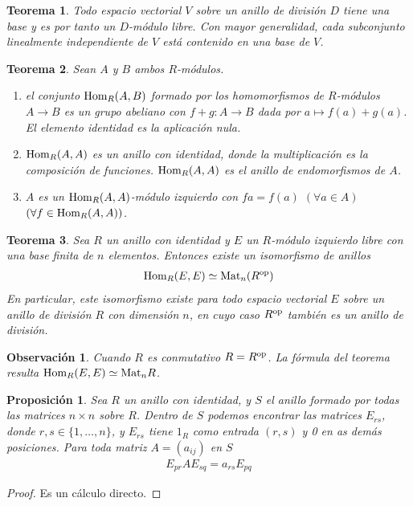 \documentclass{report}
\newcommand{\Hom}{\textnormal{Hom}}
\newcommand{\Mat}{\textnormal{Mat}}
\newtheorem{theorem}{Teorema}
\newtheorem{proposition}{Proposición}
\newtheorem{remark}{Observación}
\begin{document}
  \begin{theorem}
    \label{theorem:vectorSpaceBasis}
    Todo espacio vectorial \(V\) sobre un anillo de división \(D\) tiene una base y es por tanto un \(D\)-módulo libre.
    Con mayor generalidad, cada subconjunto linealmente independiente de \(V\) está contenido en una base de \(V\).
  \end{theorem}

  \begin{theorem}
    Sean \(A\) y \(B\) ambos \(R\)-módulos.
    \begin{enumerate}
      \item el conjunto \(\Hom_R(A, B)\) formado por los homomorfismos de \(R\)-módulos \(A \rightarrow B\) es un grupo abeliano con \(f + g : A \rightarrow B\) dada por \(a \mapsto f(a) + g(a)\).
      El elemento identidad es la aplicación nula.
      \item \(\Hom_R(A, A)\) es un anillo con identidad, donde la multiplicación es la composición de funciones.
      \(\Hom_R(A, A)\) es el \emph{anillo de endomorfismos} de \(A\).
      \item \(A\) es un \(\Hom_R(A, A)\)-módulo izquierdo con \(f a = f(a)\) \((\forall a \in A)\) \((\forall f \in \Hom_R(A, A))\).
    \end{enumerate}
  \end{theorem}

  \begin{theorem}
    \label{theorem:isomorphismBetweenMatrixAndHomomorphismRings}
    Sea \(R\) un anillo con identidad y \(E\) un \(R\)-módulo izquierdo libre con una base finita de \(n\) elementos.
    Entonces existe un isomorfismo de anillos
    \begin{align}
      \Hom_R(E, E)
      \simeq
      \Mat_n(R^{\textnormal{op}})
    \end{align}
    En particular, este isomorfismo existe para todo espacio vectorial \(E\) sobre un anillo de división \(R\) con dimensión \(n\), en cuyo caso \(R^{\textnormal{op}}\) también es un anillo de división.
  \end{theorem}
  \begin{remark}
    Cuando \(R\) es conmutativo \(R = R^{\textnormal{op}}\).
    La fórmula del teorema resulta \(\Hom_R(E, E) \simeq \Mat_n R\).
  \end{remark}

  \begin{proposition}
    Sea \(R\) un anillo con identidad, y \(S\) el anillo formado por todas las matrices \(n \times n\) sobre \(R\).
    Dentro de \(S\) podemos encontrar las matrices \(E_{r s}\), donde \(r, s \in \{1, \dots, n\}\), y \(E_{r s}\) tiene \(1_R\) como entrada \((r, s)\) y 0 en as demás posiciones.
    Para toda matriz \(A = (a_{i j})\) en \(S\)
    \begin{align}
      E_{p r} A E_{s q}
      =
      a_{r s} E_{p q}
    \end{align}
  \end{proposition}
  \begin{proof}
    Es un cálculo directo.
  \end{proof}
\end{document}
